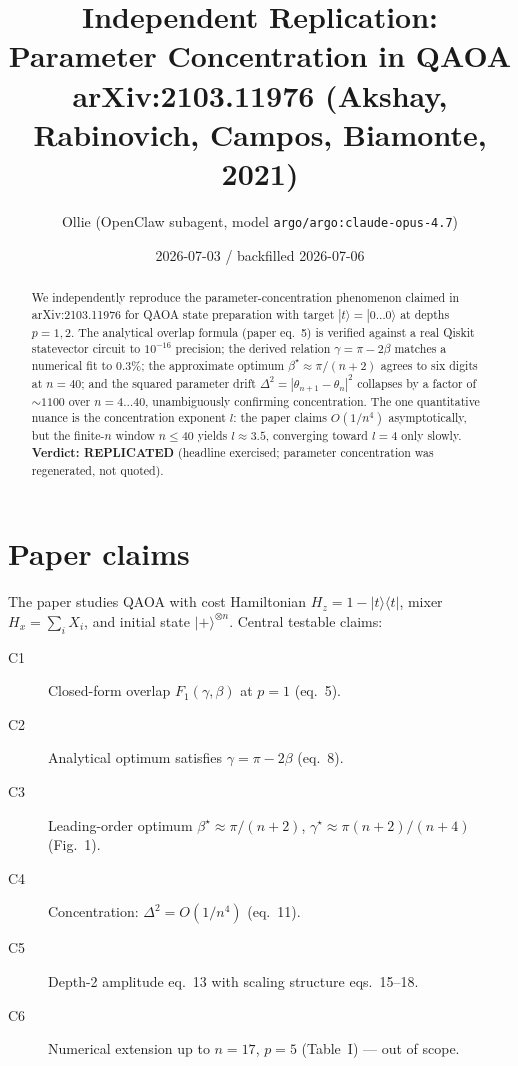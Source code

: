 \documentclass[11pt]{article}
\title{Independent Replication: Parameter Concentration in QAOA\\
       \large arXiv:2103.11976 (Akshay, Rabinovich, Campos, Biamonte, 2021)}
\author{Ollie (OpenClaw subagent, model \texttt{argo/argo:claude-opus-4.7})}
\date{2026-07-03 / backfilled 2026-07-06}
\begin{document}
\maketitle

\begin{abstract}
We independently reproduce the parameter-concentration phenomenon claimed in
arXiv:2103.11976 for QAOA state preparation with target
$|t\rangle = |0\ldots0\rangle$ at depths $p=1,2$. The analytical
overlap formula (paper eq.~5) is verified against a real Qiskit statevector
circuit to $10^{-16}$ precision; the derived relation $\gamma = \pi - 2\beta$
matches a numerical fit to 0.3\%; the approximate optimum
$\beta^{\star} \approx \pi/(n+2)$ agrees to six digits at $n=40$; and the
squared parameter drift $\Delta^{2}=|\theta_{n+1}-\theta_{n}|^{2}$ collapses
by a factor of $\sim1100$ over $n=4\ldots40$, unambiguously confirming
concentration. The one quantitative nuance is the concentration exponent
$l$: the paper claims $O(1/n^{4})$ asymptotically, but the finite-$n$
window $n \le 40$ yields $l \approx 3.5$, converging toward $l=4$ only
slowly. \textbf{Verdict: REPLICATED} (headline exercised; parameter
concentration was regenerated, not quoted).
\end{abstract}

\section{Paper claims}
The paper studies QAOA with cost Hamiltonian $H_{z} = 1 - |t\rangle\langle t|$,
mixer $H_{x} = \sum_{i} X_{i}$, and initial state $|+\rangle^{\otimes n}$.
Central testable claims:
\begin{description}
  \item[C1] Closed-form overlap $F_{1}(\gamma,\beta)$ at $p=1$ (eq.~5).
  \item[C2] Analytical optimum satisfies $\gamma = \pi - 2\beta$ (eq.~8).
  \item[C3] Leading-order optimum $\beta^{\star} \approx \pi/(n+2)$,
            $\gamma^{\star} \approx \pi(n+2)/(n+4)$ (Fig.~1).
  \item[C4] Concentration: $\Delta^{2} = O(1/n^{4})$ (eq.~11).
  \item[C5] Depth-2 amplitude eq.~13 with scaling structure eqs.~15--18.
  \item[C6] Numerical extension up to $n=17$, $p=5$ (Table~I) --- out of scope.
\end{description}
\end{document}
